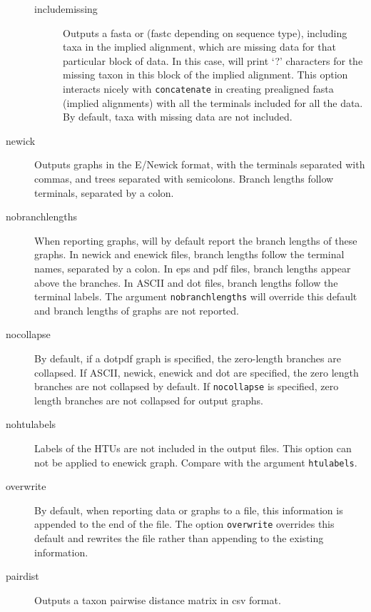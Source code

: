 \begin{description}
\begin{description}
			\item[includemissing] Outputs a fasta or (fastc depending on sequence type), 
			including taxa in the implied
			alignment, which are missing data for that particular block of data.
			In this case, \phyg will print `?' characters for the missing taxon in 
			this block of the implied alignment. This option interacts nicely with 
			\texttt{concatenate} in creating prealigned fasta (implied alignments) 
			with all the terminals included for all the data. By default, taxa with 
			missing data are not included.
			
		\end{description}
				
		\item[newick] Outputs graphs in the E/Newick format, with the terminals
		separated with commas, and trees separated with semicolons. Branch
		lengths follow terminals, separated by a colon.
		
		\item[nobranchlengths] When reporting graphs, \phyg will by default 
		report the branch lengths of these graphs. In newick and enewick files, 
		branch lengths follow the terminal names, separated by a colon. In eps 
		and pdf files, branch lengths appear above the branches. In ASCII and 
		dot files, branch lengths follow the terminal labels. The argument
		\texttt{nobranchlengths} will override this default and branch lengths 
		of graphs are not reported.
		
		\item[nocollapse] By default, if a dotpdf graph is specified, the zero-length
		branches are collapsed. If ASCII, newick, enewick and dot are specified, 
		the zero length branches are not collapsed by default.  If \texttt{nocollapse}
		is specified, zero length branches are not collapsed for output graphs.
		
		\item[nohtulabels] Labels of the HTUs are not included in the output files. 
		This option can not be applied to enewick graph. Compare with the argument 
		\texttt{htulabels}.
		
		\item[overwrite] By default, when reporting data or graphs to a file, this 
		information is appended to the end of the file. The option \texttt{overwrite} 
		overrides this default and rewrites the file rather than appending to the 
		existing information.

		\item[pairdist] Outputs a taxon pairwise distance matrix in csv format. 
		

\end{description}
